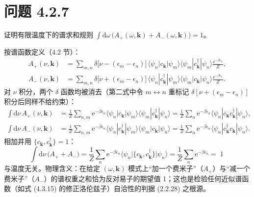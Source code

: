 \section*{问题 4.2.7}
\begin{problem}
证明有限温度下的谱求和规则 $\int\mathrm{d}\omega\,\big(A_+(\omega,\pmb{k})+A_-(\omega,\pmb{k})\big)=1$。
\end{problem}
\solution
按谱函数定义（4.2 节）：
\begin{align*}
A_+(\nu,\pmb{k})&=\sum_{m,n}\delta\big[\nu-(\epsilon_m-\epsilon_n)\big]\,
\langle\psi_n|c_{\pmb{k}}|\psi_m\rangle\langle\psi_m|c^\dagger_{\pmb{k}}|\psi_n\rangle\frac{\mathrm{e}^{-\beta\epsilon_n}}{Z},\\
A_-(\nu,\pmb{k})&=\sum_{m,n}\delta\big[\nu+(\epsilon_m-\epsilon_n)\big]\,
\langle\psi_n|c^\dagger_{\pmb{k}}|\psi_m\rangle\langle\psi_m|c_{\pmb{k}}|\psi_n\rangle\frac{\mathrm{e}^{-\beta\epsilon_n}}{Z}.
\end{align*}
对 $\nu$ 积分，两个 $\delta$ 函数均被消去（第二式中令 $m\leftrightarrow n$ 重标记 $\delta[\nu+(\epsilon_m-\epsilon_n)]$ 积分后同样不给约束）：
\begin{align*}
\int\mathrm{d}\nu\,A_+(\nu,\pmb{k})
&=\frac{1}{Z}\sum_{n,m}\mathrm{e}^{-\beta\epsilon_n}\langle\psi_n|c_{\pmb{k}}|\psi_m\rangle\langle\psi_m|c^\dagger_{\pmb{k}}|\psi_n\rangle
=\frac{1}{Z}\sum_n\mathrm{e}^{-\beta\epsilon_n}\langle\psi_n|c_{\pmb{k}}c^\dagger_{\pmb{k}}|\psi_n\rangle,\\
\int\mathrm{d}\nu\,A_-(\nu,\pmb{k})
&=\frac{1}{Z}\sum_{n,m}\mathrm{e}^{-\beta\epsilon_n}\langle\psi_n|c^\dagger_{\pmb{k}}|\psi_m\rangle\langle\psi_m|c_{\pmb{k}}|\psi_n\rangle
=\frac{1}{Z}\sum_n\mathrm{e}^{-\beta\epsilon_n}\langle\psi_n|c^\dagger_{\pmb{k}}c_{\pmb{k}}|\psi_n\rangle .
\end{align*}
相加并用 $\{c_{\pmb{k}},c^\dagger_{\pmb{k}}\}=1$：
\begin{equation*}
\int\mathrm{d}\nu\,\big(A_+ + A_-\big)
=\frac{1}{Z}\sum_n\mathrm{e}^{-\beta\epsilon_n}\big\langle\psi_n\big|\{c_{\pmb{k}},c^\dagger_{\pmb{k}}\}\big|\psi_n\big\rangle
=\frac{1}{Z}\sum_n\mathrm{e}^{-\beta\epsilon_n}=\boxed{\;1\;}
\end{equation*}
与温度无关。物理含义：在给定 $(\omega,\pmb{k})$ 模式上“加一个费米子”（$A_+$）与“减一个费米子”（$A_-$）的谱权重之和恰为反对易子的期望值 1；这也是检验任何近似谱函数（如式 (4.3.15) 的修正洛伦兹子）自洽性的判据 (2.2.28) 之根源。

